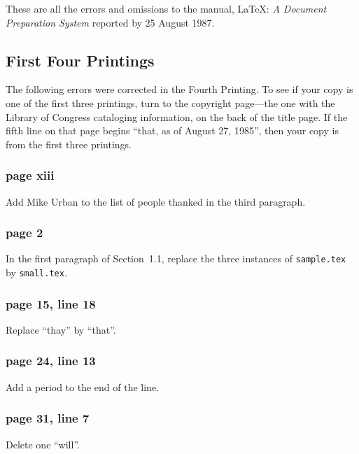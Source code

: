 
These are all the errors and omissions to the manual, \LaTeX: {\em A
Document Preparation System} reported by 25 August 1987.

\subsection{First Four Printings}

The following errors were corrected in the Fourth Printing.  To see if
your copy is one of the first three printings, turn to the copyright
page---the one with the Library of Congress cataloging information, on
the back of the title page.  If the fifth line on that page begins
``that, as of August 27, 1985'', then your copy is from the first three
printings.

\subsubsection*{page xiii}

Add Mike Urban to the list of people thanked in the third paragraph.

\subsubsection*{page 2}

In the first paragraph of Section~1.1, replace the three instances of
{\tt sample.tex} by {\tt small.tex}.

\subsubsection*{page 15, line 18}

Replace ``thay'' by ``that''.

\subsubsection*{page 24, line 13}
Add a period to the end of the line.

\subsubsection*{page 31, line 7}
Delete one ``will''.

